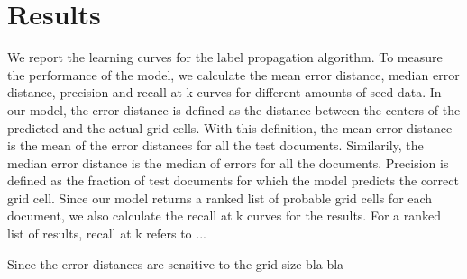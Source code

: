 \section{Results}
We report the learning curves for the label propagation algorithm.
To measure the performance of the model, we calculate the mean error distance, median error distance, precision and recall at k curves for different amounts of seed data.
In our model, the error distance is defined as the distance between the centers of the predicted and the actual grid cells.  With this definition, the mean error distance is the mean of the error distances for all the test documents. Similarily, the median error distance is the median of errors for all the documents. 
Precision is defined as the fraction of test documents for which the model predicts the correct grid cell.
Since our model returns a ranked list of probable grid cells for each document,  we also calculate the recall at k curves for the results. For a ranked list of results, recall at k refers to ...

Since the error distances are sensitive to the grid size  bla bla